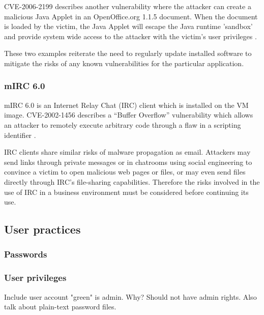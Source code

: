 CVE-2006-2199 describes another vulnerability where the attacker can create a malicious Java Applet in an OpenOffice.org 1.1.5 document. When the document is loaded by the victim, the Java Applet will escape the Java runtime 'sandbox' and provide system wide access to the attacker with the victim's user privileges \citep{MITRE2006b, SecurityTracker2006}.

These two examples reiterate the need to regularly update installed software to mitigate the risks of any known vulnerabilities for the particular application.

\subsubsection{mIRC 6.0}

mIRC 6.0 is an Internet Relay Chat (IRC) client which is installed on the VM image. CVE-2002-1456 describes a ``Buffer Overflow'' vulnerability which allows an attacker to remotely execute arbitrary code through a flaw in a scripting identifier \citep{MITRE2003, Martin2002}.

IRC clients share similar risks of malware propagation as email. Attackers may send links through private messages or in chatrooms using social engineering to convince a victim to open malicious web pages or files, or may even send files directly through IRC's file-sharing capabilities. Therefore the risks involved in the use of IRC in a business environment must be considered before continuing its use.

\subsection{User practices}

\subsubsection{Passwords}

\subsubsection{User privileges}

Include user account "green" is admin. Why? Should not have admin rights. Also talk about plain-text password files.